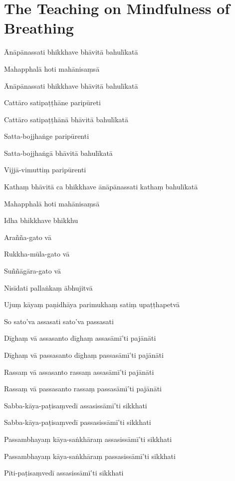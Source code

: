 \section{The Teaching on Mindfulness of Breathing}


\begin{leader}
\end{leader}

Ānāpānassati bhikkhave bhāvitā bahulīkatā

Mahapphalā hoti mahānisaṃsā

Ānāpānassati bhikkhave bhāvitā bahulīkatā

Cattāro satipaṭṭhāne paripūreti

Cattāro satipaṭṭhānā bhāvitā bahulīkatā

Satta-bojjhaṅge paripūrenti

Satta-bojjhaṅgā bhāvitā bahulīkatā

Vijjā-vimuttiṃ paripūrenti

Kathaṃ bhāvitā ca bhikkhave ānāpānassati kathaṃ bahulīkatā

Mahapphalā hoti mahānisaṃsā

Idha bhikkhave bhikkhu

Arañña-gato vā

Rukkha-mūla-gato vā

Suññāgāra-gato vā

Nisīdati pallaṅkaṃ ābhujitvā

Ujuṃ kāyaṃ paṇidhāya parimukhaṃ satiṃ upaṭṭhapetvā

So sato'va assasati sato'va passasati

Dīghaṃ vā assasanto dīghaṃ assasāmī'ti pajānāti

Dīghaṃ vā passasanto dīghaṃ passasāmī'ti pajānāti

Rassaṃ vā assasanto rassaṃ assasāmī'ti pajānāti

Rassaṃ vā passasanto rassaṃ passasāmī'ti pajānāti

Sabba-kāya-paṭisaṃvedī assasissāmī'ti sikkhati

Sabba-kāya-paṭisaṃvedī passasissāmī'ti sikkhati

Passambhayaṃ kāya-saṅkhāraṃ assasissāmī'ti sikkhati

Passambhayaṃ kāya-saṅkhāraṃ passasissāmī'ti sikkhati

Pīti-paṭisaṃvedī assasissāmī'ti sikkhati


